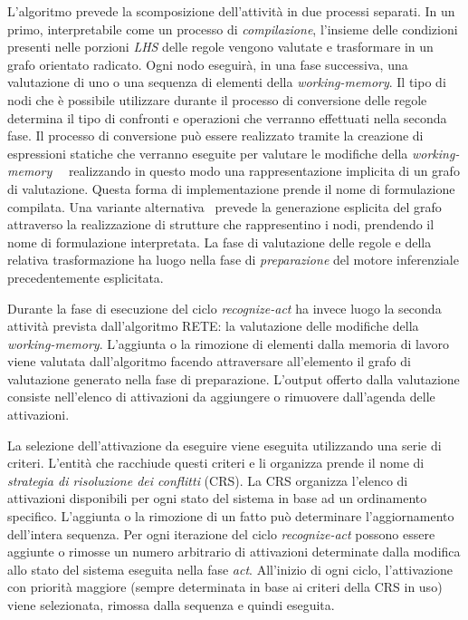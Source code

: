 L'algoritmo prevede la scomposizione dell'attività in due processi separati. In un primo, interpretabile come un processo di \emph{compilazione}, l'insieme delle condizioni presenti nelle porzioni \emph{LHS} delle regole vengono valutate e trasformare in un grafo orientato radicato. Ogni nodo eseguirà, in una fase successiva, una valutazione di uno o una sequenza di elementi della \emph{working-memory}. Il tipo di nodi che è possibile utilizzare durante il processo di conversione delle regole determina il tipo di confronti e operazioni che verranno effettuati nella seconda fase. Il processo di conversione può essere realizzato tramite la creazione di espressioni statiche che verranno eseguite per valutare le modifiche della \emph{working-memory}~\cite{forgy1979}~\cite{forgy1982} realizzando in questo modo una rappresentazione implicita di un grafo di valutazione. Questa forma di implementazione prende il nome di formulazione compilata. Una variante alternativa~\cite{Doorenbos95productionmatching} prevede la generazione esplicita del grafo attraverso la realizzazione di strutture che rappresentino i nodi, prendendo il nome di formulazione interpretata. La fase di valutazione delle regole e della relativa trasformazione ha luogo nella fase di \emph{preparazione} del motore inferenziale precedentemente esplicitata.

Durante la fase di esecuzione del ciclo \emph{recognize-act} ha invece luogo la seconda attività prevista dall'algoritmo RETE: la valutazione delle modifiche della \emph{working-memory}. L'aggiunta o la rimozione di elementi dalla memoria di lavoro viene valutata dall'algoritmo facendo attraversare all'elemento il grafo di valutazione generato nella fase di preparazione. L'output offerto dalla valutazione consiste nell'elenco di attivazioni da aggiungere o rimuovere dall'agenda delle attivazioni.

La selezione dell'attivazione da eseguire viene eseguita utilizzando una serie di criteri. L'entità che racchiude questi criteri e li organizza prende il nome di \emph{strategia di risoluzione dei conflitti} (CRS). La CRS organizza l'elenco di attivazioni disponibili per ogni stato del sistema in base ad un ordinamento specifico. L'aggiunta o la rimozione di un fatto può determinare l'aggiornamento dell'intera sequenza. Per ogni iterazione del ciclo \emph{recognize-act} possono essere aggiunte o rimosse un numero arbitrario di attivazioni determinate dalla modifica allo stato del sistema eseguita nella fase \emph{act}. All'inizio di ogni ciclo, l'attivazione con priorità maggiore (sempre determinata in base ai criteri della CRS in uso) viene selezionata, rimossa dalla sequenza e quindi eseguita.

